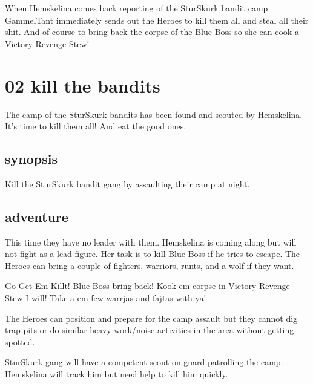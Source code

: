 When Hemskelina comes back reporting of the SturSkurk bandit camp GammelTant immediately sends out the Heroes to kill them all and steal all their shit. And of course to bring back the corpse of the Blue Boss so she can cook a Victory Revenge Stew!






\newpage
\section*{02 kill the bandits}

The camp of the SturSkurk bandits has been found and scouted by Hemskelina. It's time to kill them all! And eat the good ones.


\subsection*{synopsis}

Kill the SturSkurk bandit gang by assaulting their camp at night.


\subsection*{adventure}

This time they have no leader with them. Hemskelina is coming along but will not fight as a lead figure. Her task is to kill Blue Boss if he tries to escape.
The Heroes can bring a couple of fighters, warriors, runts, and a wolf if they want.

\begin{readoutloud}
Go Get Em Killt! Blue Boss bring back! Kook-em corpse in Victory Revenge Stew I will! Take-a em few warrjas and fajtas with-ya!
\end{readoutloud}

The Heroes can position and prepare for the camp assault but they cannot dig trap pits or do similar heavy work/noise activities in the area without getting spotted.

SturSkurk gang will have a competent scout on guard patrolling the camp. Hemskelina will track him but need help to kill him quickly.


